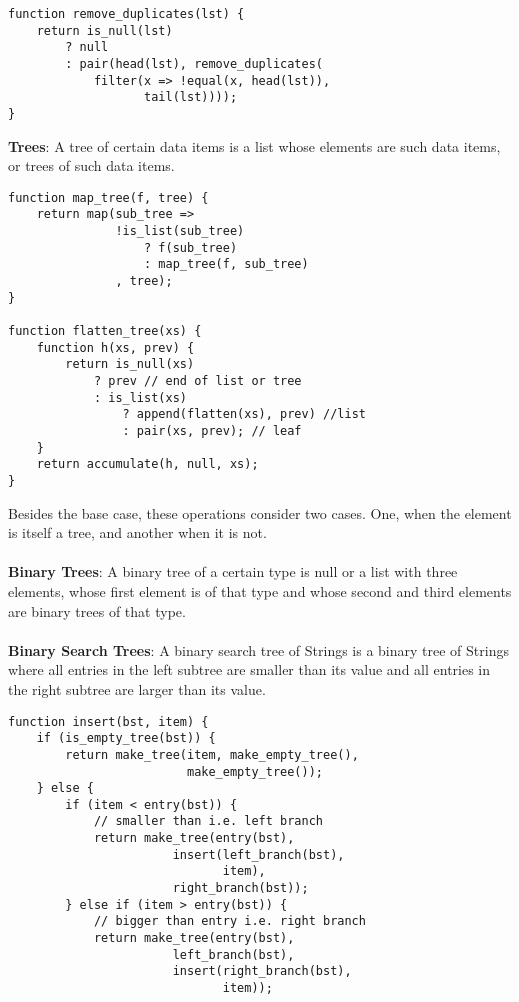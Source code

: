 \documentclass[a4paper]{article} \usepackage[backend=biber, style=numeric, sorting=none]{biblatex}
\begin{document}
\begin{multicols*}{4}
\begin{verbatim}
function remove_duplicates(lst) {
    return is_null(lst)
        ? null
        : pair(head(lst), remove_duplicates(
            filter(x => !equal(x, head(lst)),
                   tail(lst))));
}
\end{verbatim}

{\small\textbf{Trees}}: A tree of certain data items is a list whose elements are such data items, or trees of such data items.

\begin{verbatim}
function map_tree(f, tree) {
    return map(sub_tree =>
               !is_list(sub_tree)
                   ? f(sub_tree)
                   : map_tree(f, sub_tree)
               , tree);
}

function flatten_tree(xs) {
    function h(xs, prev) {
        return is_null(xs)
            ? prev // end of list or tree
            : is_list(xs)
                ? append(flatten(xs), prev) //list
                : pair(xs, prev); // leaf
    }
    return accumulate(h, null, xs);
}
\end{verbatim}

Besides the base case, these operations consider two cases. One, when the element is itself a tree, and another when it is not. 
\\ \\

{\small\textbf{Binary Trees}}: A binary tree of a certain type is null or a list with three elements, whose first element is of that type and whose second and third elements are binary trees of that type.
\\ \\
{\small\textbf{Binary Search Trees}}: A binary search tree of Strings is a binary tree of Strings where all entries in the left subtree are smaller than its value and all entries in the right subtree are larger than its value.

\begin{verbatim}
function insert(bst, item) {
    if (is_empty_tree(bst)) {
        return make_tree(item, make_empty_tree(),
        				 make_empty_tree());
    } else {
        if (item < entry(bst)) {
            // smaller than i.e. left branch
            return make_tree(entry(bst),
                       insert(left_branch(bst),
                              item),
                       right_branch(bst));
        } else if (item > entry(bst)) {
            // bigger than entry i.e. right branch
            return make_tree(entry(bst),
                       left_branch(bst),
                       insert(right_branch(bst),
                              item));



\end{verbatim}
\end{multicols*}
\end{document}
